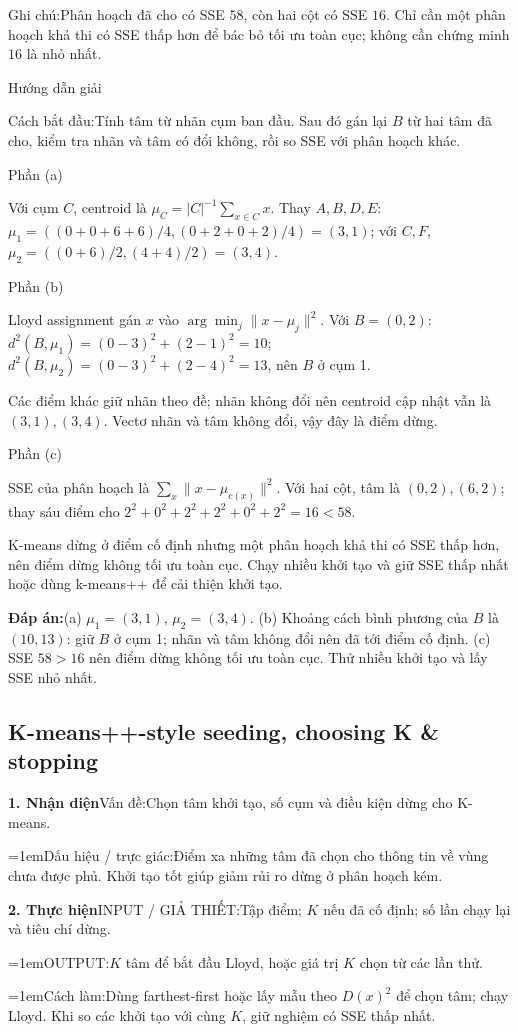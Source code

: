 \documentclass[10pt,a4paper,twocolumn]{article}
\makeatletter
\newcommand{\maptag}[1]{\phantomsection\@bsphack\protected@write\@auxout{}{\string\newlabel{#1}{{}{\thepage}{}{\@currentHref}{}}}\@esphack}
\newif\ifexamheadingprinted
\newcommand{\topic}[2]{%
  \global\examheadingprintedfalse\par\subsection{#2}\label{topic:#1}}
\newcommand{\key}[1]{#1:\enspace}
\newcommand{\solutionprompt}[1]{\par\addvspace{1pt}\noindent\key{Cách bắt đầu}#1\par\addvspace{2pt}}
\newcommand{\examnote}[1]{\par\addvspace{2pt}\noindent\key{Ghi chú}#1\par\addvspace{3pt}}
\newcommand{\blocklabel}[1]{\par\noindent#1\par\nobreak}
\newcommand{\answer}[1]{%
  \par\addvspace{3pt}%
  \blocklabel{#1Hướng dẫn giải}}
\newcommand{\finalanswer}[1]{%
  \par\addvspace{3pt}\noindent\textbf{Đáp án:}\nobreak\enspace#1\par}
\newcommand{\guidepart}[1]{%
  \par\addvspace{1.5pt}%
  \blocklabel{Phần #1}}
\newcommand{\algfield}[2]{\par\noindent\hangindent=1em\relax#1:\enspace#2}
\newcommand{\unitfield}[4]{%
  \par\noindent\textbf{#1. #2}\enspace #3:\enspace #4}
\newcommand{\algsummary}[6]{%
  \begingroup\setlength{\parskip}{1pt}%
  \unitfield{1}{Nhận diện}{Vấn đề}{#1}%
  \algfield{Dấu hiệu / trực giác}{#2}%
  \if\relax\detokenize{#3}\relax\else\par\noindent#3\par\fi%
  \unitfield{2}{Thực hiện}{INPUT / GIẢ THIẾT}{#4}%
  \algfield{OUTPUT}{#5}%
  \algfield{Cách làm}{#6}\par\endgroup}
\makeatother
\begin{document}
\examnote{Phân hoạch đã cho có SSE $58$, còn hai cột có SSE $16$. Chỉ cần một phân hoạch khả thi có SSE thấp hơn để bác bỏ tối ưu toàn cục; không cần chứng minh $16$ là nhỏ nhất.}
\answer{\maptag{answer:Pr8}}
\solutionprompt{Tính tâm từ nhãn cụm ban đầu. Sau đó gán lại $B$ từ hai tâm đã cho, kiểm tra nhãn và tâm có đổi không, rồi so SSE với phân hoạch khác.}
\guidepart{(a)}
\begin{guidesteps}
\item Với cụm $C$, centroid là $\mu_C=|C|^{-1}\sum_{x\in C}x$. Thay $A,B,D,E$: $\mu_1=((0+0+6+6)/4,(0+2+0+2)/4)=(3,1)$; với $C,F$, $\mu_2=((0+6)/2,(4+4)/2)=(3,4)$.
\end{guidesteps}
\guidepart{(b)}
\begin{guidesteps}
\item Lloyd assignment gán $x$ vào $\arg\min_j\|x-\mu_j\|^2$. Với $B=(0,2)$: $d^2(B,\mu_1)=(0-3)^2+(2-1)^2=10$; $d^2(B,\mu_2)=(0-3)^2+(2-4)^2=13$, nên $B$ ở cụm 1.
\item Các điểm khác giữ nhãn theo đề; nhãn không đổi nên centroid cập nhật vẫn là $(3,1),(3,4)$. Vectơ nhãn và tâm không đổi, vậy đây là điểm dừng.
\end{guidesteps}
\guidepart{(c)}
\begin{guidesteps}
\item SSE của phân hoạch là $\sum_x\|x-\mu_{c(x)}\|^2$. Với hai cột, tâm là $(0,2),(6,2)$; thay sáu điểm cho $2^2+0^2+2^2+2^2+0^2+2^2=16<58$.
\item K-means dừng ở điểm cố định nhưng một phân hoạch khả thi có SSE thấp hơn, nên điểm dừng không tối ưu toàn cục. Chạy nhiều khởi tạo và giữ SSE thấp nhất hoặc dùng k-means++ để cải thiện khởi tạo.
\end{guidesteps}
\finalanswer{(a) $\mu_1=(3,1)$, $\mu_2=(3,4)$. (b) Khoảng cách bình phương của $B$ là $(10,13)$: giữ $B$ ở cụm 1; nhãn và tâm không đổi nên đã tới điểm cố định. (c) SSE $58>16$ nên điểm dừng không tối ưu toàn cục. Thử nhiều khởi tạo và lấy SSE nhỏ nhất.}
\topic{seeding}{K-means++-style seeding, choosing K \& stopping}

\algsummary{Chọn tâm khởi tạo, số cụm và điều kiện dừng cho K-means.}{Điểm xa những tâm đã chọn cho thông tin về vùng chưa được phủ. Khởi tạo tốt giúp giảm rủi ro dừng ở phân hoạch kém.}{}{Tập điểm; $K$ nếu đã cố định; số lần chạy lại và tiêu chí dừng.}{$K$ tâm để bắt đầu Lloyd, hoặc giá trị $K$ chọn từ các lần thử.}{Dùng farthest-first hoặc lấy mẫu theo $D(x)^2$ để chọn tâm; chạy Lloyd. Khi so các khởi tạo với cùng $K$, giữ nghiệm có SSE thấp nhất.}
\end{document}
